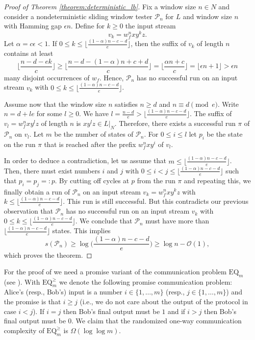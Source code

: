 \documentclass{article}\usepackage[a4paper,margin=20mm]{geometry}
\renewcommand{\O}{\mathcal{O}}
\renewcommand{\P}{\mathcal{P}}
\renewcommand{\geq}{\geqslant}
\renewcommand{\leq}{\leqslant}
\renewcommand{\le}{\leq}
\begin{document}
\begin{proof}[Proof of Theorem \ref{theorem:deterministic_lb}]
Fix a window size $n\in N$
and consider a nondeterministic sliding window tester $\P_n$ for $L$
and window size $n$ with Hamming gap $\epsilon n$.
Define for $k \geq 0$ the input stream
\[
	v_k = w_f^n x y^k z .
\]
Let $\alpha = c \epsilon < 1$.
If $0 \le k \le \lfloor \frac{(1-\alpha) n - c - d}{e} \rfloor$, then the suffix of $v_k$ of length $n$ 
contains at least
\[
\bigg\lfloor\frac{n - d - e k}{c} \bigg\rfloor \geq 
\bigg\lfloor\frac{n - d - (1-\alpha) n + c + d}{c} \bigg\rfloor = 
\bigg\lfloor\frac{\alpha n + c}{c} \bigg\rfloor = \lfloor \epsilon n + 1 \rfloor > \epsilon n
\]
many disjoint occurrences of $w_f$.
Hence, $\P_n$ has no successful run on an input stream $v_k$ with
$0 \le k \le \lfloor \frac{(1-\alpha) n - c - d}{e} \rfloor$.

Assume now that the window size $n$ satisfies $n \geq d$ and $n \equiv d \pmod e$.
Write $n = d + l e$ for some $l \geq 0$.
We have $l = \frac{n-d}{e} > \lfloor \frac{(1-\alpha) n - c - d}{e} \rfloor$.
The suffix of $v_l = w_f^n x y^l z$ of length $n$ is $x y^l z \in L|_N$.
Therefore, there exists a successful run $\pi$ of $\P_n$ on $v_l$.
Let $m$ be the number of states of $\P_n$.
For $0 \leq i \leq l$ let $p_i$ be the state on the run $\pi$ that is reached
after the prefix $w_f^n x y^i$ of $v_l$.

In order to deduce a contradiction, let us assume that
$m \leq \lfloor \frac{(1-\alpha) n - c - d}{e} \rfloor$.
Then, there must exist numbers $i$ and $j$ with $0 \leq i < j \leq \lfloor \frac{(1-\alpha) n - c - d}{e} \rfloor$
such that $p_i = p_j =: p$. By cutting off cycles at $p$ from the run $\pi$ and repeating this,
we finally obtain a run of $\P_n$ on 
an input stream  $v_k = w_f^n x y^k z$ with $k \leq \lfloor \frac{(1-\alpha) n - c - d}{e} \rfloor$.
This run is still successful. But this contradicts our previous observation that
$\P_n$ has no successful run on an input stream $v_k$ with
$0 \le k \le \lfloor \frac{(1-\alpha) n - c - d}{e} \rfloor$.
We conclude that $\P_n$ must have more than $\lfloor \frac{(1-\alpha) n - c - d}{e} \rfloor$ states.
This implies
\[
s(\P_n) \geq \log \bigg( \frac{(1-\alpha) n - c - d}{e} \bigg) \geq \log n - \O(1) ,
\]
which proves the theorem.
\end{proof}

For the proof of  we need a promise variant of the communication problem $\mathrm{EQ}_m$ (see ).
With $\mathrm{EQ}^{\geq}_m$  we denote the following promise communication problem: Alice's (resp., Bob's) input is a number $i \in \{1,\ldots,m\}$ 
(resp., $j \in \{1,\ldots,m\}$) and the promise is that $i \geq j$ (i.e., we do not care about the output of the protocol in case $i < j$). 
If $i = j$ then Bob's final output must be $1$ and if $i > j$ then Bob's final output must be $0$.
We claim that the randomized one-way communication complexity of $\mathrm{EQ}^{\geq}_m$ is $\Omega(\log \log m)$. 
\end{document}
